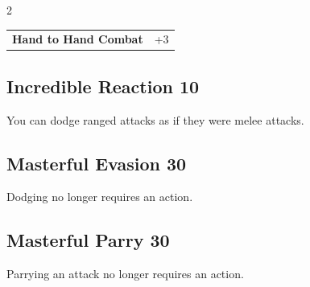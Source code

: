 \begin{multicols}{2}
\begin{tcolorbox}
\begin{tabular}{@{}ll@{}}
    \textbf{Hand to Hand Combat} & +3\\
\end{tabular}


\end{tcolorbox}

\begin{tcolorbox}
    \subsection*{Incredible Reaction \hfill \small{10 }}
    \tcblower
You can dodge ranged attacks as if they were melee attacks.


\vspace{3mm}



\end{tcolorbox}

\begin{tcolorbox}
    \subsection*{Masterful Evasion \hfill \small{30 }}
    \tcblower
Dodging no longer requires an action.


\vspace{3mm}



\end{tcolorbox}

\begin{tcolorbox}
    \subsection*{Masterful Parry \hfill \small{30 }}
    \tcblower
Parrying an attack no longer requires an action.



\end{tcolorbox}
\end{multicols}
